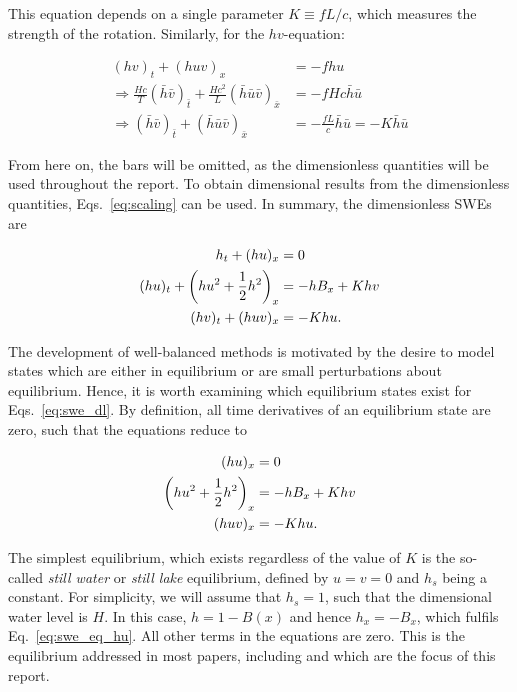This equation depends on a single parameter $K \equiv fL/c$, which measures the strength of the rotation. Similarly, for the $hv$-equation:

\begin{align}
  (hv)_t + (huv)_x & = - fhu \\
  \Rightarrow \frac{Hc}{T} (\bar h\bar v)_{\bar t} + \frac{Hc^2}{L} (\bar h\bar u\bar v)_{\bar x} & = - fHc\bar h\bar u \\
  \Rightarrow (\bar h\bar v)_{\bar t} + (\bar h\bar u\bar v)_{\bar x} & = - \frac{fL}{c}\bar h\bar u = -K\bar h\bar u
\end{align}

From here on, the bars will be omitted, as the dimensionless quantities will be used throughout the report. To obtain dimensional results from the dimensionless quantities, Eqs.~\ref{eq:scaling} can be used. In summary, the dimensionless SWEs are

\begin{subequations}
  \label{eq:swe_dl}
  \begin{align}
    h_{t} + (h u)_{x} & = 0 \label{eq:swe_dl_h} \\
    (hu)_{t} + \qty(hu^2 + \frac{1}{2} h^2)_{x} & = - hB_{x} + Khv \label{eq:swe_dl_hu} \\
    (hv)_{t} + (huv)_{x} & = -Khu.\label{eq:swe_dl_hv}
  \end{align}
\end{subequations}

The development of well-balanced methods is motivated by the desire to model states which are either in equilibrium or are small perturbations about equilibrium. Hence, it is worth examining which equilibrium states exist for Eqs.~\ref{eq:swe_dl}. By definition, all time derivatives of an equilibrium state are zero, such that the equations reduce to

\begin{subequations}
  \label{eq:swe_eq}
  \begin{align}
    (h u)_{x} & = 0 \label{eq:swe_eq_h} \\
    \qty(hu^2 + \frac{1}{2} h^2)_{x} & = - hB_{x} + Khv \label{eq:swe_eq_hu}\\
    (huv)_{x} & = -Khu \label{eq:swe_eq_hv}.
  \end{align}
\end{subequations}

The simplest equilibrium, which exists regardless of the value of $K$ is the so-called \emph{still water} or \emph{still lake} equilibrium, defined by $u = v = 0$ and $h_s$ being a constant. For simplicity, we will assume that $h_s = 1$, such that the dimensional water level is $H$. In this case, $h = 1 - B(x)$ and hence $h_x = - B_x$, which fulfils Eq.~\ref{eq:swe_eq_hu}. All other terms in the equations are zero. This is the equilibrium addressed in most papers, including \cite{leveque1998balancing} and \cite{rogers2003mathematical} which are the focus of this report.

